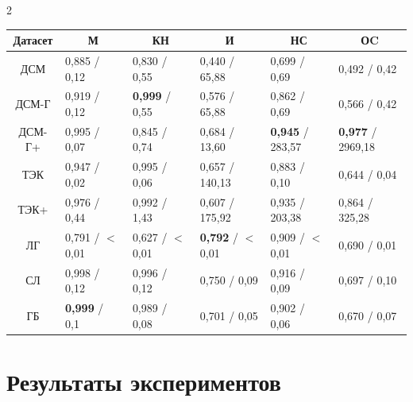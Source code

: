 \begin{multicols}{2}
\begin{table}
\begin{center}
\vspace*{2ex}





\begin{tabular}{|c|l|l|l|l|l|}


\hline


Датасет&\multicolumn{1}{c|}{М}&\multicolumn{1}{c|}{КН}&\multicolumn{1}{c|}{И}&\multicolumn{1}{c|}{НС}&\multicolumn{1}{c|}{ОC}\\


\hline


ДСМ&0,885 / 0,12&0,830 / 0,55&0,440 / 65,88&0,699 / 0,69&0,492 / 0,42\\


ДСМ-Г&0,919 / 0,12&\textbf{0,999} / 0,55&0,576 / 65,88&0,862 / 0,69&0,566 / 0,42\\


ДСМ-Г+&0,995 / 0,07&0,845 / 0,74&0,684 / 13,60&\textbf{0,945} / 283,57&\textbf{0,977} / 2969,18\\


ТЭК&0,947 / 0,02&0,995 / 0,06&0,657 / 140,13&0,883 / 0,10&0,644 / 0,04\\


ТЭК+&0,976 / 0,44&0,992 / 1,43&0,607 / 175,92&0,935 / 203,38&0,864 / 325,28\\


ЛГ&0,791 / $<$0,01&0,627 / $<$0,01&\textbf{0,792} / $<$0,01&0,909 / $<$0,01&0,690 / 0,01\\


СЛ&0,998 / 0,12&0,996 / 0,12&0,750 / 0,09&0,916 / 0,09&0,697 / 0,10\\


ГБ&\textbf{0,999} / 0,1&0,989 / 0,08&0,701 / 0,05&0,902 / 0,06&0,670 / 0,07\\


\hline


\end{tabular}


\end{center}


\vspace*{-6pt}


\end{table}





\vspace*{-6pt}





\section{Результаты экспериментов}






\end{multicols}
